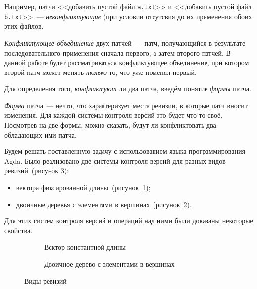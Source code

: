 Например, патчи <<добавить пустой файл \texttt{a.txt}>> и <<добавить
пустой файл \texttt{b.txt}>>~--- \emph{неконфликтующие} (при условии
отсутсвия до их применения обоих этих файлов.

\begin{definition}
  \emph{Конфликтующее объединение} двух патчей~--- патч, получающийся
  в результате последовательного применения сначала первого, а затем
  второго патчей. В данной работе будет рассматриваться конфликтующее
  объединение, при котором второй патч может менять \emph{только} то,
  что уже поменял первый.
\end{definition}

Для определения того, \emph{конфликтуют} ли два патча, введём понятие
\emph{формы} патча.

\begin{definition}
  \emph{Форма} патча~--- нечто, что характеризует места ревизии, в
  которые патч вносит изменения. Для каждой системы контроля версий
  это будет что-то своё. Посмотрев на две формы, можно сказать, будут
  ли конфликтовать два обладающих ими патча.
\end{definition}

Будем решать поставленную задачу с использованием языка
программирования Agda. Было реализовано две системы контроля версий
для разных видов ревизий~(рисунок \ref{fig:repotypes}): 
\begin{itemize}
\item вектора фиксированной длины~(рисунок~\ref{fig:repotypes-vec});
\item двоичные деревья с элементами в
  вершинах~(рисунок~\ref{fig:repotypes-tree}).
\end{itemize}

Для этих систем контроля версий и операций над ними были доказаны
некоторые свойства.

\begin{figure}
  \centering
  \begin{subfigure}[b]{0.45\textwidth}
    \centering
    \caption{Вектор константной длины}
    \label{fig:repotypes-vec}
  \end{subfigure}
  \begin{subfigure}[b]{0.45\textwidth}
    \centering
    \caption{Двоичное дерево с элементами в вершинах}
    \label{fig:repotypes-tree}
  \end{subfigure}
  \caption{Виды ревизий}
  \label{fig:repotypes}
\end{figure}

